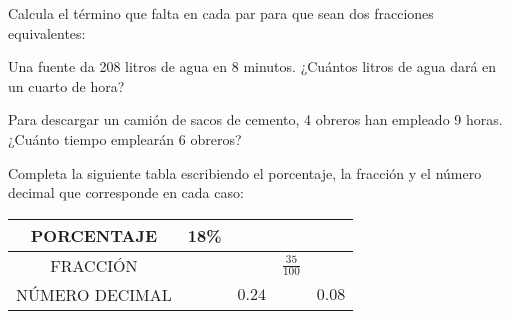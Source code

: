 \documentclass[spanish, 11pt]{exam}
\begin{document}
\begin{questions}




\question[1] Calcula el término que falta en cada par para que sean dos fracciones equivalentes:
\begin{multicols}{3}
\end{multicols}


\question[1\half] Una fuente da 208 litros de agua en 8 minutos. ¿Cuántos litros de agua dará en un cuarto de hora?



\question[1] Para descargar un camión de sacos de cemento, 4 obreros han empleado 9 horas. ¿Cuánto tiempo emplearán 6 obreros?



\question[1\half] Completa la siguiente tabla escribiendo el porcentaje, la fracción y el número decimal que corresponde en cada caso:
\begin{center}
    \begin{tabular}{|c|c|c|c|c|}
        \hline
        PORCENTAJE & 18\% & & & \\ \hline
        FRACCIÓN & & & $\frac{35}{100}$ & \\ \hline
        NÚMERO DECIMAL & & $0.24$ & & $0.08$ \\ \hline
    \end{tabular}
\end{center}


\end{questions}
\end{document}
